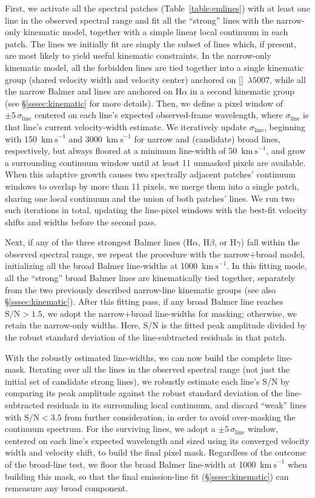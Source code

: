 \documentclass[modern,linenumbers]{aastex702}
\newcommand{\kms}{\ensuremath{\mathrm{km~s}^{-1}}}
\newcommand{\hei}{\ion{He}{1}}
\newcommand{\ha}{\ensuremath{\mathrm{H}\alpha}}
\newcommand{\hb}{\ensuremath{\mathrm{H}\beta}}
\newcommand{\hg}{\ensuremath{\mathrm{H}\gamma}}
\newcommand{\oiiilam}{[\ion{O}{3}]~$\lambda5007$}
\begin{document}
First, we activate all the spectral patches
(Table~\ref{table:emlines}) with at least one line in the observed
spectral range and fit all the ``strong'' lines with the narrow-only
kinematic model, together with a simple linear local continuum in each
patch. The lines we initially fit are simply the subset of lines
which, if present, are most likely to yield useful kinematic
constraints. In the narrow-only kinematic model, all the forbidden
lines are tied together into a single kinematic group (shared velocity
width and velocity center) anchored on \oiiilam, while all the narrow
Balmer and \hei{} lines are anchored on \ha{} in a second
kinematic group (see \S\ref{sssec:kinematic} for more details). Then,
we define a pixel window of $\pm5\,\sigma_\mathrm{line}$ centered on
each line's expected observed-frame wavelength, where
$\sigma_\mathrm{line}$ is that line's current velocity-width
estimate. We iteratively update $\sigma_\mathrm{line}$, beginning with
150~\kms{} and 3000~\kms{} for narrow and (candidate) broad lines,
respectively, but always floored at a minimum line-width of 50~\kms,
and grow a surrounding continuum window until at least 11 unmasked
pixels are available. When this adaptive growth causes two spectrally
adjacent patches' continuum windows to overlap by more than 11 pixels,
we merge them into a single patch, sharing one local continuum and the
union of both patches' lines. We run two such iterations in total,
updating the line-pixel windows with the best-fit velocity shifts and
widths before the second pass.

Next, if any of the three strongest Balmer lines (\ha, \hb, or \hg)
fall within the observed spectral range, we repeat the procedure with
the narrow+broad model, initializing all the broad Balmer line-widths
at 1000~\kms. In this fitting mode, all the ``strong'' broad Balmer
lines are kinematically tied together, separately from the two
previously described narrow-line kinematic groups (see also
\S\ref{sssec:kinematic}). After this fitting pass, if any broad Balmer
line reaches $\mathrm{S/N} > 1.5$, we adopt the narrow+broad
line-widths for masking; otherwise, we
retain the narrow-only widths. Here, S/N is the fitted peak
amplitude divided by the robust standard deviation of the
line-subtracted residuals in that patch.

With the robustly estimated line-widths, we can now build the complete
line-mask. Iterating over all the lines in the observed spectral range
(not just the initial set of candidate strong lines), we robustly
estimate each line's S/N by comparing its peak
amplitude against the robust standard
deviation of the line-subtracted residuals in its surrounding local
continuum, and discard ``weak'' lines with $\mathrm{S/N} < 3.5$ from
further consideration, in order to avoid over-masking the continuum
spectrum. For the surviving lines, we adopt a
$\pm5\,\sigma_\mathrm{line}$ window, centered on each line's expected
wavelength and sized using its converged velocity width and velocity
shift, to build the final pixel mask. Regardless of the outcome
of the broad-line test, we floor the broad Balmer line-width at
1000~\kms{} when building this mask, so that the final emission-line
fit (\S\ref{sssec:kinematic}) can remeasure any broad component.
\end{document}
